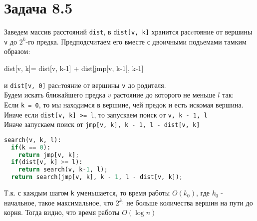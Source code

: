 \documentclass[12pt]{article}
\begin{document}
\section{Задача 8.5}
Заведем массив расстояний \verb|dist|, в \verb|dist[v, k]| хранится расcтояние от
вершины \verb$v$ до $2^{k}$-го предка.
Предподсчитаем его вместе с двоичными подъемами тамким образом: \\
\begin{verb}
dist[v, k]= dist[v, k-1] + dist[jmp[v, k-1], k-1]
\end{verb}
и \verb|dist[v, 0]| расcтояние от вершины \verb|v| до родителя. \\
Будем искать ближайшего предка $v$ растояние до которого не меньше $l$ так: \\
Если \verb|k = 0|, то мы находимся в вершине, чей предок и есть искомая вершина. \\
Иначе если \verb|dist[v, k] >= l|, то запускаем поиск от \verb|v, k - 1, l|
\\
Иначе запускаем поиск от \verb|jmp[v, k], k - 1, l - dist[v, k]| \\
\begin{lstlisting}[language=Python]
search(v, k, l):
  if(k == 0):
    return jmp[v, k];
  if(dist[v, k] >= l):
    return search(v, k-1, l);
  return search(jmp[v, k], k - 1, l - dist[v, k]);
\end{lstlisting}
Т.к. с каждым шагом \verb|k| уменьшается, то время работы $O(k_{0})$, где
$k_{0}$ - начальное, такое максимальное, что $2^{k_{0}}$ не больше количества вершин на пути до корня. Тогда видно,
что время работы $O(\log n)$
\end{document}
